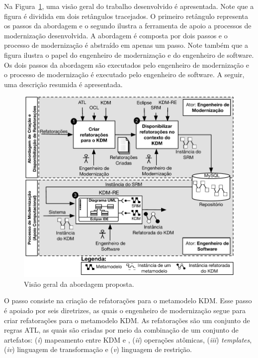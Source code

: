 

Na Figura~\ref{fig:abordagem_kdm_tese_processo}, uma visão geral do trabalho desenvolvido é apresentada. Note que a figura é dividida em dois retângulos tracejados. O primeiro retângulo representa os passos da abordagem e o segundo ilustra a ferramenta de apoio a processos de modernização desenvolvida. A abordagem é composta por dois passos e o processo de modernização é abstraído em apenas um passo. Note também que a figura ilustra o papel do engenheiro de modernização e do engenheiro de software. 
Os dois passos da abordagem são executados pelo engenheiro de modernização e o processo de modernização é executado pelo engenheiro de software. A seguir, uma descrição resumida é apresentada.

\begin{figure}[h]
	\centering
	\caption{Visão geral da abordagem proposta.}
	\label{fig:abordagem_kdm_tese_processo}
	\includegraphics[scale=0.8]{images/NovaFiguraSintexeAbordagem}
	\fautor
\end{figure}


O passo  consiste na criação de refatorações para o metamodelo KDM. Esse passo é apoiado por seis diretrizes, as quais o engenheiro de modernização segue para criar refatorações para o metamodelo KDM. As refatorações são um conjunto de regras ATL, as quais são criadas por meio da combinação de um conjunto de artefatos: (\textit{i}) mapeamento entre KDM e , (\textit{ii}) operações atômicas, (\textit{iii}) \textit{templates}, (\textit{iv}) linguagem de transformação e (\textit{v}) linguagem de restrição.


